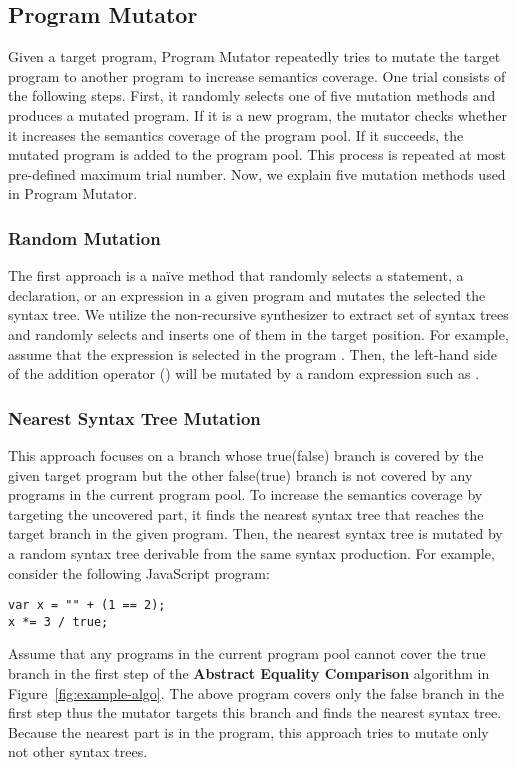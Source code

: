 \subsection{Program Mutator}

Given a target program, \textsf{Program Mutator} repeatedly tries to mutate the
target program to another program to increase semantics coverage.  One trial
consists of the following steps.  First, it randomly selects one of five
mutation methods and produces a mutated program.  If it is a new program, the
mutator checks whether it increases the semantics coverage of the program pool.
If it succeeds, the mutated program is added to the program pool.  This process
is repeated at most pre-defined maximum trial number.  Now, we explain five
mutation methods used in \textsf{Program Mutator}.


\subsubsection{Random Mutation}
The first approach is a na\"ive method that randomly selects a statement, a
declaration, or an expression in a given program and mutates the selected the
syntax tree.  We utilize the non-recursive synthesizer to extract set of syntax
trees and randomly selects and inserts one of them in the target position.
For example, assume that the expression  is selected in the program
.  Then, the left-hand side of the addition operator
(\code{+}) will be mutated by a random expression such as .


\subsubsection{Nearest Syntax Tree Mutation}
This approach focuses on a branch whose true(false) branch is covered by the
given target program but the other false(true) branch is not covered by any
programs in the current program pool.  To increase the semantics coverage by
targeting the uncovered part, it finds the nearest syntax tree that reaches the
target branch in the given program.  Then, the nearest syntax tree is mutated by
a random syntax tree derivable from the same syntax production.  For example,
consider the following JavaScript program:
\begin{lstlisting}[style=myJSstyle]
var x = "" + (1 == 2);
x *= 3 / true;
\end{lstlisting}
Assume that any programs in the current program pool cannot cover the true
branch in the first step of the \textbf{Abstract Equality Comparison} algorithm
in Figure~\ref{fig:example-algo}.  The above program covers only the false
branch in the first step thus the mutator targets this branch and finds the
nearest syntax tree.  Because the nearest part is  in the program,
this approach tries to mutate only  not other syntax trees.


